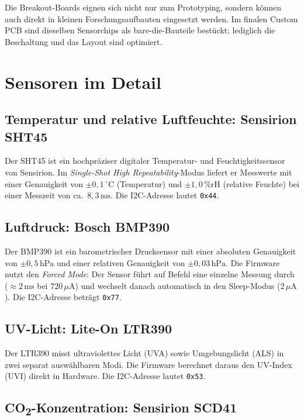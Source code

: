 Die Breakout-Boards eignen sich nicht nur zum Prototyping, sondern können auch direkt in kleinen Forschungsaufbauten eingesetzt werden. Im finalen Custom PCB sind dieselben Sensorchips als bare-die-Bauteile bestückt; lediglich die Beschaltung und das Layout sind optimiert.

\newpage

\section*{Sensoren im Detail}

\subsection*{Temperatur und relative Luftfeuchte: Sensirion SHT45}

Der SHT45 ist ein hochpräziser digitaler Temperatur- und Feuchtigkeitssensor von Sensirion. Im \textit{Single-Shot High Repeatability}-Modus liefert er Messwerte mit einer Genauigkeit von $\pm 0{,}1\,{^\circ}$C (Temperatur) und $\pm 1{,}0\,\%\text{rH}$ (relative Feuchte) bei einer Messzeit von ca.\ $8{,}3\,\text{ms}$. Die I2C-Adresse lautet \texttt{0x44}.

\subsection*{Luftdruck: Bosch BMP390}

Der BMP390 ist ein barometrischer Drucksensor mit einer absoluten Genauigkeit von $\pm 0{,}5\,\text{hPa}$ und einer relativen Genauigkeit von $\pm 0{,}03\,\text{hPa}$. Die Firmware nutzt den \textit{Forced Mode}: Der Sensor führt auf Befehl eine einzelne Messung durch ($\approx 2\,\text{ms}$ bei $720\,\mu\text{A}$) und wechselt danach automatisch in den Sleep-Modus ($2\,\mu\text{A}$). Die I2C-Adresse beträgt \texttt{0x77}.

\subsection*{UV-Licht: Lite-On LTR390}

Der LTR390 misst ultraviolettes Licht (UVA) sowie Umgebungslicht (ALS) in zwei separat auswählbaren Modi. Die Firmware berechnet daraus den UV-Index (UVI) direkt in Hardware. Die I2C-Adresse lautet \texttt{0x53}.

\subsection*{CO\textsubscript{2}-Konzentration: Sensirion SCD41}


